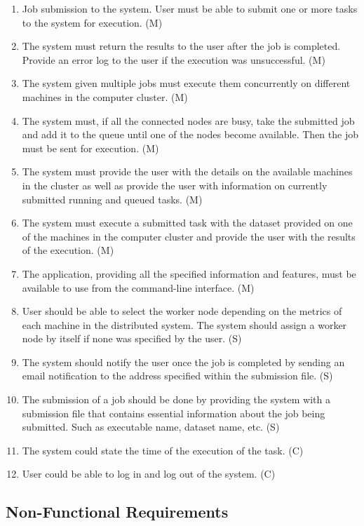 \documentclass[10pt]{report}
\begin{document}
\begin{enumerate}
    \item Job submission to the system. User must be able to submit one or more tasks to the system for execution. (M)
    \item The system must return the results to the user after the job is completed. Provide an error log to the user if the execution was unsuccessful. (M)
    \item The system given multiple jobs must execute them concurrently on different machines in the computer cluster. (M)
    \item The system must, if all the connected nodes are busy, take the submitted job and add it to the queue until one of the nodes become available. Then the job must be sent for execution. (M)
    \item The system must provide the user with the details on the available machines in the cluster as well as provide the user with information on currently submitted running and queued tasks. (M)
    \item The system must execute a submitted task with the dataset provided on one of the machines in the computer cluster and provide the user with the results of the execution. (M)
    \item The application, providing all the specified information and features, must be available to use from the command-line interface. (M)
    \item User should be able to select the worker node depending on the metrics of each machine in the distributed system. The system should assign a worker node by itself if none was specified by the user. (S)
    \item The system should notify the user once the job is completed by sending an email notification to the address specified within the submission file. (S)
    \item The submission of a job should be done by providing the system with a submission file that contains essential information about the job being submitted. Such as executable name, dataset name, etc. (S)
    \item The system could state the time of the execution of the task. (C)
    \item User could be able to log in and log out of the system. (C)

\end{enumerate}

\subsection{Non-Functional Requirements} \label{nonfunc}
\end{document}
